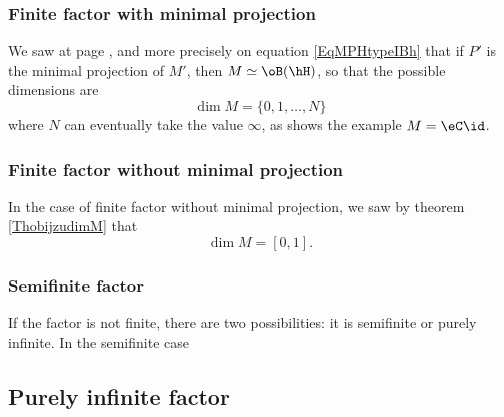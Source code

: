 					\subsubsection{Finite factor with minimal projection}

We saw at page \pageref{PgtypeIonavu}, and more precisely on equation \eqref{EqMPHtypeIBh} that if $P'$ is the minimal projection of $M'$, then $M\simeq\oB(\hH)$, so that the possible dimensions are
\begin{equation}
	\dim M=\{ 0,1,\ldots,N \}
\end{equation}
where $N$ can eventually take the value $\infty$, as shows the example $M=\eC\id$.

					\subsubsection{Finite factor without minimal projection}

In the case of finite factor without minimal projection, we saw by theorem \ref{ThobijzudimM} that 
\begin{equation}
	\dim M=[0,1].
\end{equation}

					\subsubsection{Semifinite factor}

If the factor is not finite, there are two possibilities: it is semifinite or purely infinite. In the semifinite case

					\subsection{Purely infinite factor}

